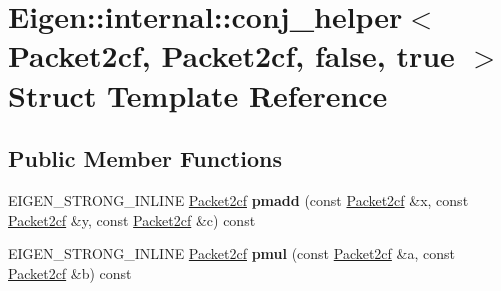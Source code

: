 \hypertarget{struct_eigen_1_1internal_1_1conj__helper_3_01_packet2cf_00_01_packet2cf_00_01false_00_01true_01_4}{}\section{Eigen\+:\+:internal\+:\+:conj\+\_\+helper$<$ Packet2cf, Packet2cf, false, true $>$ Struct Template Reference}
\label{struct_eigen_1_1internal_1_1conj__helper_3_01_packet2cf_00_01_packet2cf_00_01false_00_01true_01_4}
\subsection*{Public Member Functions}
\begin{DoxyCompactItemize}
\item 
\mbox{\label{struct_eigen_1_1internal_1_1conj__helper_3_01_packet2cf_00_01_packet2cf_00_01false_00_01true_01_4_a39029f97833eb088f1a544ad8bfd6523}} 
E\+I\+G\+E\+N\+\_\+\+S\+T\+R\+O\+N\+G\+\_\+\+I\+N\+L\+I\+NE \hyperlink{struct_eigen_1_1internal_1_1_packet2cf}{Packet2cf} {\bfseries pmadd} (const \hyperlink{struct_eigen_1_1internal_1_1_packet2cf}{Packet2cf} \&x, const \hyperlink{struct_eigen_1_1internal_1_1_packet2cf}{Packet2cf} \&y, const \hyperlink{struct_eigen_1_1internal_1_1_packet2cf}{Packet2cf} \&c) const
\item 
\mbox{\label{struct_eigen_1_1internal_1_1conj__helper_3_01_packet2cf_00_01_packet2cf_00_01false_00_01true_01_4_a862dc97e126dc92a670828ee289031ec}} 
E\+I\+G\+E\+N\+\_\+\+S\+T\+R\+O\+N\+G\+\_\+\+I\+N\+L\+I\+NE \hyperlink{struct_eigen_1_1internal_1_1_packet2cf}{Packet2cf} {\bfseries pmul} (const \hyperlink{struct_eigen_1_1internal_1_1_packet2cf}{Packet2cf} \&a, const \hyperlink{struct_eigen_1_1internal_1_1_packet2cf}{Packet2cf} \&b) const
\item 
\mbox{\label{struct_eigen_1_1internal_1_1conj__helper_3_01_packet2cf_00_01_packet2cf_00_01false_00_01true_01_4_a39029f97833eb088f1a544ad8bfd6523}} 

\end{DoxyCompactItemize}
